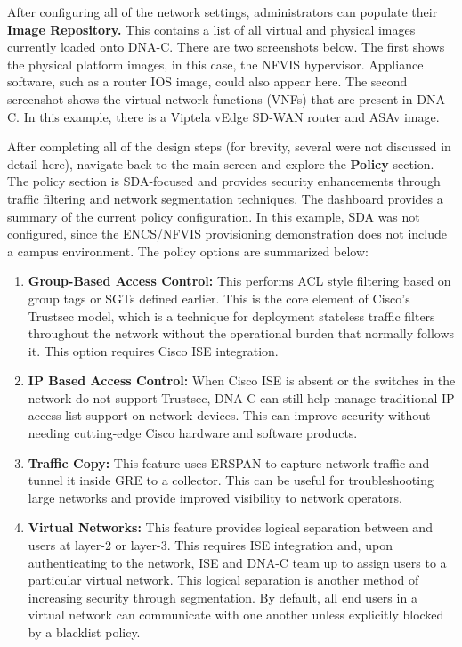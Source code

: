 
After configuring all of the network settings, administrators can populate
their \textbf{Image Repository.} This contains a list of all virtual and physical
images currently loaded onto DNA-C. There are two screenshots below. The first
shows the physical platform images, in this case, the NFVIS hypervisor.
Appliance software, such as a router IOS image, could also appear here. The
second screenshot shows the virtual network functions (VNFs) that are present
in DNA-C. In this example, there is a Viptela vEdge SD-WAN router and ASAv image.



After completing all of the design steps (for brevity, several were not
discussed in detail here), navigate back to the main screen and explore the
\textbf{Policy} section. The policy section is SDA-focused and provides
security enhancements through traffic filtering and network segmentation
techniques. The dashboard provides a summary of the current policy
configuration. In this example, SDA was not configured, since the ENCS/NFVIS
provisioning demonstration does not include a campus environment. The policy
options are summarized below:

\begin{enumerate}
  \item \textbf{Group-Based Access Control:} This performs ACL style filtering based
  on group tags or SGTs defined earlier. This is the core element of Cisco's
  Trustsec model, which is a technique for deployment stateless traffic filters
  throughout the network without the operational burden that normally follows
  it. This option requires Cisco ISE integration.
  \item \textbf{IP Based Access Control:} When Cisco ISE is absent or the switches
  in the network do not support Trustsec, DNA-C can still help manage traditional
  IP access list support on network devices. This can improve security without
  needing cutting-edge Cisco hardware and software products.
  \item \textbf{Traffic Copy:} This feature uses ERSPAN to capture network traffic
  and tunnel it inside GRE to a collector. This can be useful for troubleshooting
  large networks and provide improved visibility to network operators.
  \item \textbf{Virtual Networks:} This feature provides logical separation between
  and users at layer-2 or layer-3. This requires ISE integration and, upon
  authenticating to the network, ISE and DNA-C team up to assign users to a
  particular virtual network. This logical separation is another method of
  increasing security through segmentation. By default, all end users in a
  virtual network can communicate with one another unless explicitly blocked by
  a blacklist policy.
\end{enumerate}

